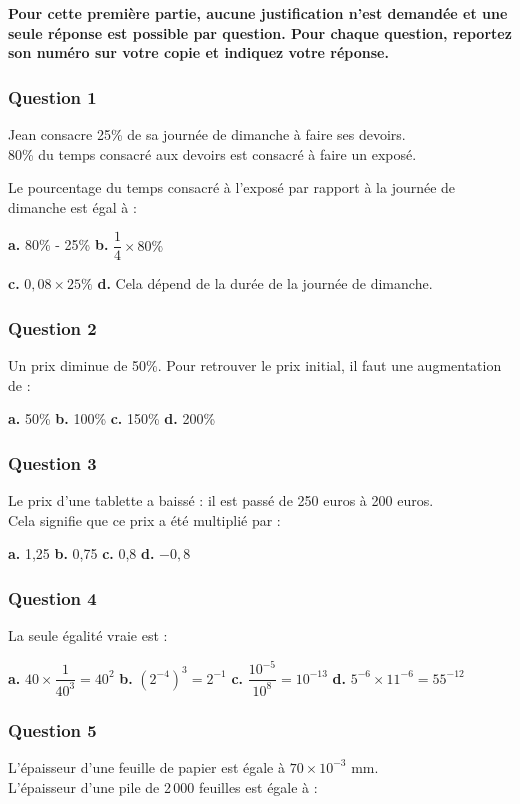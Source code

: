 \textbf{Pour cette première partie, aucune justification n'est demandée et une seule réponse est possible par question. Pour chaque question, reportez son numéro sur votre copie et indiquez votre réponse.}

\subsubsection*{Question 1}
Jean consacre 25\% de sa journée de dimanche à faire ses devoirs. \\
80\% du temps consacré aux devoirs est consacré à faire un exposé.

Le pourcentage du temps consacré à l'exposé par rapport à la journée de dimanche est égal à :

\textbf{a.} 80\% - 25\% \hfill \textbf{b.} $\dfrac{1}{4} \times 80\%$

\textbf{c.} $0,08 \times 25\%$ \hfill \textbf{d.} Cela dépend de la durée de la journée de dimanche.

\subsubsection*{Question 2}
Un prix diminue de 50\%. Pour retrouver le prix initial, il faut une augmentation de :

\textbf{a.} 50\% \hfill \textbf{b.} 100\% \hfill \textbf{c.} 150\% \hfill \textbf{d.} 200\%

\subsubsection*{Question 3}
Le prix d'une tablette a baissé : il est passé de 250 euros à 200 euros. \\
Cela signifie que ce prix a été multiplié par :

\textbf{a.} 1,25 \hfill \textbf{b.} 0,75 \hfill \textbf{c.} 0,8 \hfill \textbf{d.} $-0,8$

\subsubsection*{Question 4}
La seule égalité vraie est :

\textbf{a.} $40 \times \dfrac{1}{40^3} = 40^2$ \hfill \textbf{b.} $(2^{-4})^3 = 2^{-1}$ \hfill \textbf{c.} $\dfrac{10^{-5}}{10^8} = 10^{-13}$ \hfill \textbf{d.} $5^{-6} \times 11^{-6} = 55^{-12}$

\subsubsection*{Question 5}
L'épaisseur d'une feuille de papier est égale à $70 \times 10^{-3}$ mm. \\
L'épaisseur d'une pile de 2\,000 feuilles est égale à :

